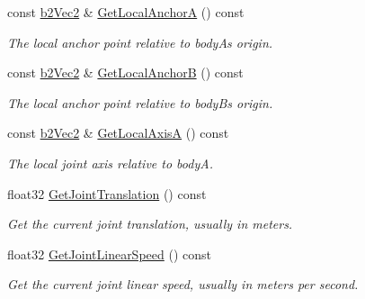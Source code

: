 \begin{DoxyCompactItemize}
const \hyperlink{structb2_vec2}{b2\+Vec2} \& \hyperlink{classb2_wheel_joint_aaf132c39227962a0b0788558e7dd6662}{Get\+Local\+AnchorA} () const
\begin{DoxyCompactList}\small\item\em The local anchor point relative to bodyA\textquotesingle{}s origin. \end{DoxyCompactList}\item 
\mbox{\label{classb2_wheel_joint_a78c56833f42bfc61998aa5ea8c876f3e}} 
const \hyperlink{structb2_vec2}{b2\+Vec2} \& \hyperlink{classb2_wheel_joint_a78c56833f42bfc61998aa5ea8c876f3e}{Get\+Local\+AnchorB} () const
\begin{DoxyCompactList}\small\item\em The local anchor point relative to bodyB\textquotesingle{}s origin. \end{DoxyCompactList}\item 
\mbox{\label{classb2_wheel_joint_a86bf4dbf356f9095c05d62313810e602}} 
const \hyperlink{structb2_vec2}{b2\+Vec2} \& \hyperlink{classb2_wheel_joint_a86bf4dbf356f9095c05d62313810e602}{Get\+Local\+AxisA} () const
\begin{DoxyCompactList}\small\item\em The local joint axis relative to bodyA. \end{DoxyCompactList}\item 
\mbox{\label{classb2_wheel_joint_a4cebb70f659344d5d93c1885d47000e3}} 
float32 \hyperlink{classb2_wheel_joint_a4cebb70f659344d5d93c1885d47000e3}{Get\+Joint\+Translation} () const
\begin{DoxyCompactList}\small\item\em Get the current joint translation, usually in meters. \end{DoxyCompactList}\item 
\mbox{\label{classb2_wheel_joint_a3cbdc95c55c9bf5b9f2b46b05fc2a5e5}} 
float32 \hyperlink{classb2_wheel_joint_a3cbdc95c55c9bf5b9f2b46b05fc2a5e5}{Get\+Joint\+Linear\+Speed} () const
\begin{DoxyCompactList}\small\item\em Get the current joint linear speed, usually in meters per second. \end{DoxyCompactList}\item 

\end{DoxyCompactItemize}
